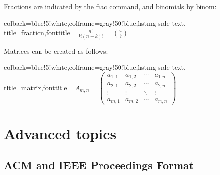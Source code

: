 Fractions are indicated by the frac command, and binomials by binom:

\begin{tcblisting}{colback=blue!5!white,colframe=gray!50!blue,listing side text,  title=fraction,fonttitle=\bfseries}
$ \frac{n!}{k!(n-k)!} = \binom{n}{k} $   
\end{tcblisting}

Matrices can be created as follows:

\begin{tcblisting}{colback=blue!5!white,colframe=gray!50!blue,listing side text,  title=matrix,fonttitle=\bfseries}
$ A_{m,n} = 
\begin{pmatrix}
  a_{1,1} & a_{1,2} & \cdots & a_{1,n} \\
  a_{2,1} & a_{2,2} & \cdots & a_{2,n} \\
  \vdots  & \vdots  & \ddots & \vdots  \\
  a_{m,1} & a_{m,2} & \cdots & a_{m,n} 
\end{pmatrix} $
\end{tcblisting}



\section{Advanced topics}

\subsection{ACM and IEEE Proceedings Format}\label{acm-proceedings-format}

